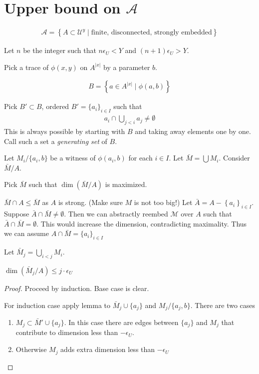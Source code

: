 \documentclass{amsart}
\renewcommand{\AA}{\mathscr A}
\newcommand{\M}{\mathcal M}
\newcommand{\U}{\mathcal U}
\newcommand{\curly}[1]{\left\{#1\right\}}
\begin{document}
\section{Upper bound on $\AA$}

\begin{Definition}
	\begin{align*}
		\AA = \curly{A \subset \U^{y} \mid \text{finite, disconnected, strongly embedded}}
	\end{align*}
\end{Definition}

Let $n$ be the integer such that $n \epsilon_U < Y$ and $(n+1) \epsilon_U > Y$.

Pick a trace of $\phi(x,y)$ on $A^{|x|}$ by a parameter $b$.

\begin{align*}
	B = \curly{a \in A^{|x|} \mid \phi(a, b)}
\end{align*}

Pick $B' \subset B$, ordered $B' = \{a_i\}_{i \in I}$ such that
\begin{align*}
	a_i \cap \bigcup_{j < i} a_j \neq \emptyset
\end{align*}
This is always possible by starting with $B$ and taking away elements one by one.
Call such a set a \emph{generating set} of $B$.

Let $M_i / \{a_i, b\}$ be a witness of $\phi(a_i, b)$ for each $i \in I$.
Let $\bar M = \bigcup M_i$.
Consider $\bar M / A$.

Pick $\bar M$ such that $\dim(\bar M / A)$ is maximized.

$\bar M \cap A \leq \bar M$ as $A$ is strong. (Make sure $M$ is not too big!)
Let $\bar A = A - \curly{a_i}_{i \in I}$.
Suppose $\bar A \cap \bar M \neq \emptyset$.
Then we can abstractly reembed $\M$ over $A$ such that $\bar A \cap \bar M = \emptyset$.
This would increase the dimension, contradicting maximality.
Thus we can assume $A \cap \bar M = \{a_i\}_{i \in I}$

Let $\bar M_j = \bigcup_{i < j} M_i$.

\begin{Lemma}
	$\dim(\bar M_j / A) \leq j \cdot \epsilon_U$
\end{Lemma}
\begin{proof}
	Proceed by induction.
	Base case is clear.

	For induction case apply lemma to $\bar M_j \cup \{a_j\}$ and $M_j / \{a_j, b\}$.
	There are two cases
	\begin{enumerate}
		\item $M_j \subset \bar M' \cup \{a_j\}$.
		In this case there are edges between $\{a_j\}$ and $M_j$ that contribute to dimension less than $-\epsilon_U$.
		\item Otherwise $M_j$ adds extra dimension less than $-\epsilon_U$
	\end{enumerate}
\end{proof}
\end{document}
